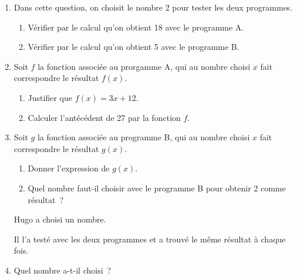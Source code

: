 \documentclass{article}
\begin{document}
    \begin{enumerate}
        \item Dans cette question, on choisit le nombre 2 pour tester les
        deux programmes.
        \begin{enumerate}
            \item Vérifier par le calcul qu'on obtient 18 avec le programme A.
            \item Vérifier par le calcul qu'on obtient 5 avec le programme B.
        \end{enumerate}
        \item Soit $f$ la fonction associée au prorgamme A, qui au nombre
        choisi $x$ fait correspondre le résultat $f(x)$.
        \begin{enumerate}
            \item Justifier que $f(x)=3x+12$.
            \item Calculer l'antécédent de 27 par la fonction $f$.
        \end{enumerate}
        \item Soit $g$ la fonction associée au programme B, qui au nombre
        choisi $x$ fait correspondre le résultat $g(x)$.
        \begin{enumerate}
            \item Donner l'expression de $g(x)$.
            \item Quel nombre faut-il choisir avec le programme B pour
            obtenir 2 comme résultat~?
        \end{enumerate}
        \begingroup\leavevmode\hspace*{-\leftmargin}%
            \begin{minipage}{.9\linewidth}
                Hugo a choisi un nombre.\par\noindent
                Il l'a testé avec les deux programmes et a trouvé le même résultat
                à chaque fois.
            \end{minipage}
        \endgroup
        \item Quel nombre a-t-il choisi~?
    \end{enumerate}
\newpage
    \begin{center}
    \end{center}
\end{document}
